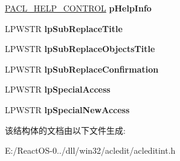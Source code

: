 \begin{DoxyCompactItemize}
\item 
\mbox{\label{struct___a_c_l___d_l_g___c_o_n_t_r_o_l_a2dbaa2caf3fc282934d9e08c5bd0d0fc}} 
\hyperlink{struct___a_c_l___h_e_l_p___c_o_n_t_r_o_l}{P\+A\+C\+L\+\_\+\+H\+E\+L\+P\+\_\+\+C\+O\+N\+T\+R\+OL} {\bfseries p\+Help\+Info}
\item 
\mbox{\label{struct___a_c_l___d_l_g___c_o_n_t_r_o_l_a7fbfe93deeefef3a66a053565d960126}} 
L\+P\+W\+S\+TR {\bfseries lp\+Sub\+Replace\+Title}
\item 
\mbox{\label{struct___a_c_l___d_l_g___c_o_n_t_r_o_l_a45e72a1225b896c51ea6a3d83c7359af}} 
L\+P\+W\+S\+TR {\bfseries lp\+Sub\+Replace\+Objects\+Title}
\item 
\mbox{\label{struct___a_c_l___d_l_g___c_o_n_t_r_o_l_a6bead1973fb53d45ef297eb319817976}} 
L\+P\+W\+S\+TR {\bfseries lp\+Sub\+Replace\+Confirmation}
\item 
\mbox{\label{struct___a_c_l___d_l_g___c_o_n_t_r_o_l_aba3a81a609930830c95f85d585a94d8a}} 
L\+P\+W\+S\+TR {\bfseries lp\+Special\+Access}
\item 
\mbox{\label{struct___a_c_l___d_l_g___c_o_n_t_r_o_l_a490f44580a25a7a3a583dad91973f4c2}} 
L\+P\+W\+S\+TR {\bfseries lp\+Special\+New\+Access}
\end{DoxyCompactItemize}


该结构体的文档由以下文件生成\+:\begin{DoxyCompactItemize}
\item 
E\+:/\+React\+O\+S-\/0../dll/win32/acledit/acleditint.\+h\end{DoxyCompactItemize}

